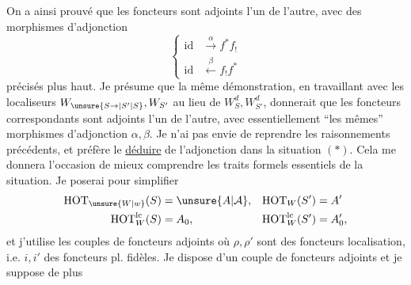 On a ainsi prouvé que les foncteurs
sont adjoints l'un de l'autre, avec des morphismes d'adjonction
\[
 \left\{\begin{aligned}
 \mathrm{id}&\xrightarrow{\alpha} f^*f_!\\
 \mathrm{id}&\xleftarrow{\beta} f_!f^*
 \end{aligned}\right.
\]
précisés plus haut. Je présume que la même démonstration, en travaillant avec les  localiseurs  $W_{\unsure{S\to|S'|S}},W_{S'}$ au lieu de $W_S^d,W_{S'}^d$, donnerait que les foncteurs correspondants
sont adjoints l'un de l'autre, avec essentiellement ``les mêmes'' morphismes d'adjonction $\alpha,\beta$. Je n'ai pas envie de reprendre les raisonnements précédents, et préfère le  \uline{déduire} de l'adjonction dans la situation $(*)$. Cela me donnera l'occasion de mieux comprendre les traits formels essentiels de la situation. Je poserai pour simplifier
\[
 \begin{aligned}
 \mathrm{HOT}_{\unsure{W|w}}(S)&=\unsure{A|\mathcal{A}},&\mathrm{HOT}_W(S')&=A'\\
 \mathrm{HOT}^{\mathrm{lc}}_W(S)&=A_0,&\mathrm{HOT}^{\mathrm{lc}}_W(S')&=A'_0,
 \end{aligned}
\]
et j'utilise les couples de foncteurs adjoints
où $\rho,\rho'$ sont des foncteurs  localisation, i.e. $i,i'$ des foncteurs pl. fidèles.  Je dispose d'un couple de foncteurs adjoints
et je suppose  de plus

